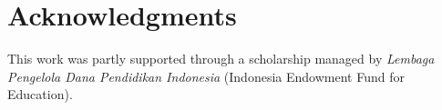 \documentclass[conference]{IEEEtran}
\begin{document}
%







\section*{Acknowledgments}
This work was partly supported through a scholarship managed by \emph{Lembaga Pengelola Dana Pendidikan Indonesia} (Indonesia Endowment Fund for Education).

\end{document}
